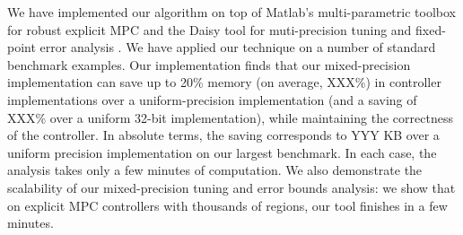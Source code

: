We have implemented our algorithm on top of Matlab's multi-parametric toolbox 
for robust explicit MPC \cite{Matlab-MPT?}
and the Daisy tool for muti-precision tuning and fixed-point error analysis \cite{Daisy}.
We have applied our technique on a number of standard benchmark examples.
Our implementation finds that our mixed-precision implementation can save up to 20\% memory (on average, XXX\%) in controller
implementations over a uniform-precision implementation (and a saving of XXX\% over a uniform 32-bit implementation), while
maintaining the correctness of the controller.
In absolute terms, the saving corresponds to YYY KB over a uniform precision implementation on our largest benchmark.
In each case, the analysis takes only a few minutes of computation.
We also demonstrate the scalability of our mixed-precision tuning and error bounds analysis:
we show that on explicit MPC controllers with thousands of regions, our tool finishes in a few minutes.

